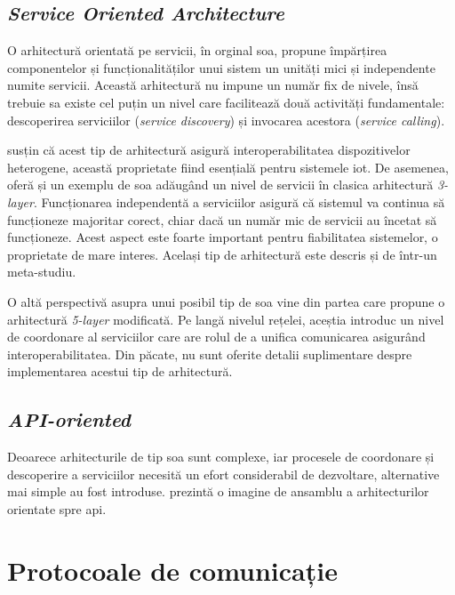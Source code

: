 \subsection*{\textit{Service Oriented Architecture}}

O arhitectură orientată pe servicii, în orginal \acrfull{soa}, propune împărțirea componentelor și funcționalităților unui sistem un unități mici și independente numite servicii. Această arhitectură nu impune un număr fix de nivele, însă trebuie sa existe cel puțin un nivel care facilitează două activități fundamentale: descoperirea serviciilor (\textit{service discovery}) și invocarea acestora (\textit{service calling}). 

\cite{Khodadadi2016} susțin că acest tip de arhitectură asigură interoperabilitatea dispozitivelor heterogene, această proprietate fiind esențială pentru sistemele \acrshort{iot}. De asemenea, oferă și un exemplu de \acrshort{soa} adăugând un nivel de servicii în clasica arhitectură \textit{3-layer}. Funcționarea independentă a serviciilor asigură că sistemul va continua să funcționeze majoritar corect, chiar dacă un număr mic de servicii au încetat să funcționeze. Acest aspect este foarte important pentru fiabilitatea sistemelor, o proprietate de mare interes. Același tip de arhitectură este descris și de \cite{Lin2017} într-un meta-studiu.

O altă perspectivă asupra unui posibil tip de \acrshort{soa} vine din partea \cite{LuTan2010} care propune o arhitectură \textit{5-layer} modificată. Pe langă nivelul rețelei, aceștia introduc un nivel de coordonare al serviciilor care are rolul de a unifica comunicarea asigurând interoperabilitatea. Din păcate, nu sunt oferite detalii suplimentare despre implementarea acestui tip de arhitectură.

\subsection*{\textit{API-oriented}}

Deoarece arhitecturile de tip \acrshort{soa} sunt complexe, iar procesele de coordonare și descoperire a serviciilor necesită un efort considerabil de dezvoltare, alternative mai simple au fost introduse. \cite{Khodadadi2016} prezintă o imagine de ansamblu a arhitecturilor orientate spre \acrfull{api}. %

\section{Protocoale de comunicație}

